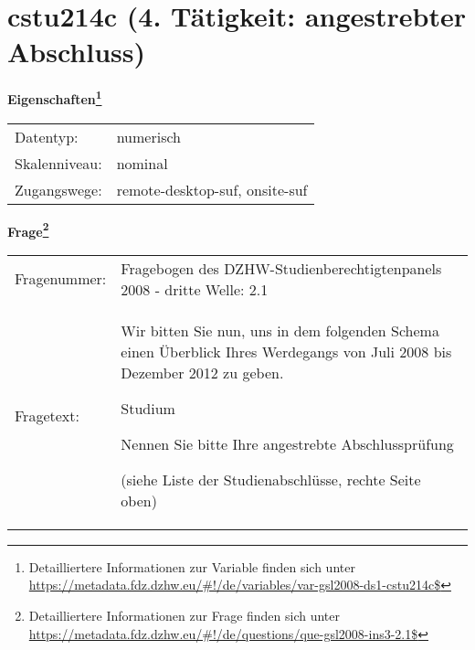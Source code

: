 
    \setcounter{footnote}{0}

    \vspace*{-1.8cm}
	\section{cstu214c (4. Tätigkeit: angestrebter Abschluss)}
	\label{section:cstu214c}



    \vspace*{0.5cm}
    \noindent\textbf{Eigenschaften\footnote{Detailliertere Informationen zur Variable finden sich unter
		\url{https://metadata.fdz.dzhw.eu/\#!/de/variables/var-gsl2008-ds1-cstu214c$}}}\\
	\begin{tabularx}{\hsize}{@{}lX}
	Datentyp: & numerisch \\
	Skalenniveau: & nominal \\
	Zugangswege: &
	  remote-desktop-suf, 
	  onsite-suf
 \\
    \end{tabularx}



				\vspace*{0.5cm}
                \noindent\textbf{Frage\footnote{Detailliertere Informationen zur Frage finden sich unter
		              \url{https://metadata.fdz.dzhw.eu/\#!/de/questions/que-gsl2008-ins3-2.1$}}}\\
				\begin{tabularx}{\hsize}{@{}lX}
					Fragenummer: &
					  Fragebogen des DZHW-Studienberechtigtenpanels 2008 - dritte Welle:
					  2.1
 \\
					Fragetext: & Wir bitten Sie nun, uns in dem folgenden Schema einen Überblick Ihres Werdegangs von Juli 2008 bis Dezember 2012 zu geben.\par  Studium\par  Nennen Sie bitte Ihre angestrebte Abschlussprüfung \par  (siehe Liste der Studienabschlüsse, rechte Seite oben) \\
				\end{tabularx}





